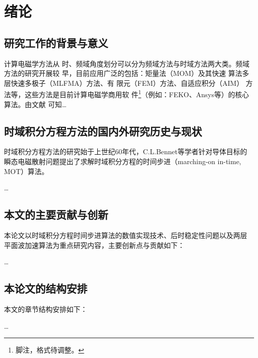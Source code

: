 \chapter{绪论}

\section{研究工作的背景与意义}

计算电磁学方法\Cite{white2012hadoop,ghemawat2003google,ross2000pvfs}从
时、频域角度划分可以分为频域方法与时域方法两大类。频域方法的研究开展较
早，目前应用广泛的包括：矩量法（MOM）\Cite{banker2011mongodb}及其快速
算法多层快速多极子（MLFMA）\Cite{beck2002junit,beck2004junit}方法、有
限元（FEM）\Cite{hunt2010zookeeper}方法、自适应积分（AIM）%
\Cite{shvachko2010hadoop}方法等，这些方法是目前计算电磁学商用软
件\footnote{脚注，格式待调整。}（例如：FEKO、Ansys等）的核心算法。由文献%
\cite{banker2011mongodb,beck2004junit,hunt2010zookeeper,shvachko2010hadoop}
可知\ldots

\section{时域积分方程方法的国内外研究历史与现状}

时域积分方程方法的研究始于上世纪60年代，C.L.Bennet等学者针对导体目标的
瞬态电磁散射问题提出了求解时域积分方程的时间步进（marching-on in-time,
  MOT）算法。

\ldots

\section{本文的主要贡献与创新}

本论文以时域积分方程时间步进算法的数值实现技术、后时稳定性问题以及两层
平面波加速算法为重点研究内容，主要创新点与贡献如下：

\ldots

\section{本论文的结构安排}

本文的章节结构安排如下：

\ldots
